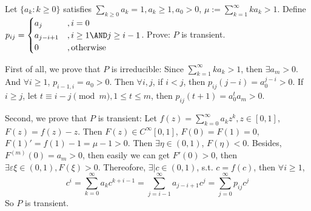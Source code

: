 \documentclass{ctexart}
\begin{document}
\begin{problem}\label{pro:8}
  Let \(\{a_k:k \geq 0\}\) satisfies \(\sum_{k \geq 0}a_k =1, a_k \geq 1, a_0 >0\), \(\mu :=\sum_{k=1}^{\infty} ka_k >1\).
  Define \(p_{ij}=
  \begin{cases}
    a_j         & , i =0                    \\
    a_{j-i + 1} & ,i \geq 1 \AND j \geq i-1 \\
    0           & ,\text{otherwise}
  \end{cases}
  \).
  Prove: \(P\) is transient.
\end{problem}
\begin{solution}
  First of all, we prove that \(P\) is irreducible: Since \(\sum_{k=1}^{\infty} ka_k > 1\), then \(\exists a_m >0\).
  And \(\forall i \geq 1\), \( p_{i-1,i}=a_0 >0\). Then \(\forall i,j \), if \(i < j\), then \(p_{ij}(j-i)=a_0^{j-i}>0\).
  If \(i \geq j\), let \(t \equiv i-j \pmod{m}, 1 \leq t \leq m\), then \(p_{ij}(t + 1)=a_0^{t}a_m >0\).

  Second, we prove that \(P\) is transient: Let \(f(z)=\sum_{k=0}^{\infty} a_kz^k, z \in [0,1]\),
  \(F(z)=f(z)-z\). Then \(F(z) \in C^{\infty}[0,1]\), \(F(0)=F(1)=0\), \(F(1)'=f(1)-1=\mu-1>0\).
  Then \(\exists \eta \in (0,1)\), \(F(\eta)<0\).
  Besides, \(F^{(m)}(0)=a_m>0\), then easily we can get \(F'(0) >0\), then \(\exists \varepsilon \xi \in (0,1), F(\xi)>0\).
  Thereofore, \(\exists \mid c \in (0,1)\), s.t. \(c=f(c)\), then \(\forall i \geq 1\),
  \[
    c^i=\sum_{k=0}^{\infty} a_kc^{k + i-1}=\sum_{j=i-1}^{\infty} a_{j-i + 1}c^j=\sum_{j=0}^{\infty} p_{ij}c^j
  \]
  So \(P\) is transient.
\end{solution}
\end{document}
